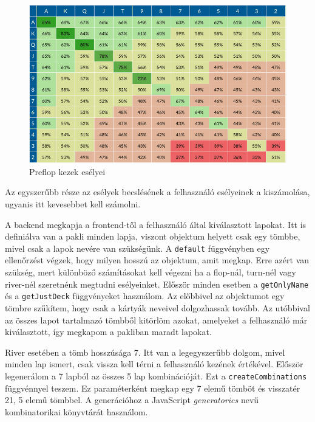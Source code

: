 \begin{figure}[h]
\centering
\includegraphics[width=\textwidth]{images/preflop-chances.png}
\caption{Preflop kezek esélyei \cite{preflop-chances}}
\label{fig:preflop-chances}
\end{figure}


Az egyszerűbb része az esélyek becslésének a felhasználó esélyeinek a kiszámolása, ugyanis itt kevesebbet kell számolni. 

A backend megkapja a frontend-től a felhasználó által kiválasztott lapokat. Itt is definiálva van a pakli minden lapja, viszont objektum helyett csak egy tömbbe, mivel csak a lapok nevére van szükségünk. A \texttt{default} függvényben egy ellenőrzést végzek, hogy milyen hosszú az objektum, amit megkap. Erre azért van szükség, mert különböző számításokat kell végezni ha a flop-nál, turn-nél vagy river-nél szeretnénk megtudni esélyeinket. Először minden esetben a \texttt{getOnlyName} és a \texttt{getJustDeck} függvényeket használom. Az előbbivel az objektumot egy tömbre szűkítem, hogy csak a kártyák neveivel dolgozhassak tovább. Az utóbbival az összes lapot tartalmazó tömbből kitörlöm azokat, amelyeket a felhasználó már kiválasztott, így megkapom a pakliban maradt lapokat.

River esetében a tömb hosszúsága 7. Itt van a legegyszerűbb dolgom, mivel minden lap ismert, csak vissza kell térni a felhasználó kezének értékével. Először legenerálom a 7 lapból az összes 5 lap kombinációját. Ezt a \texttt{createCombinations} függvénnyel teszem. Ez paraméterként megkap egy 7 elemű tömböt és visszatér 21, 5 elemű tömbbel. A generációhoz a JavaScript \textit{generatorics} nevű kombinatorikai könyvtárát használom.

